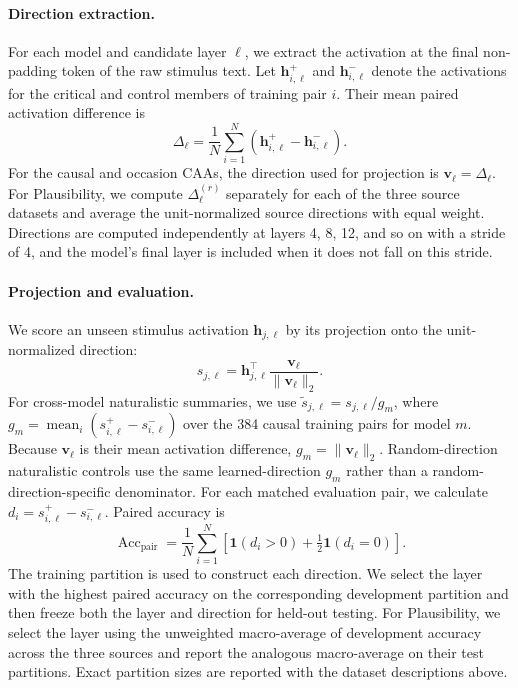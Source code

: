 \documentclass{article}
\begin{document}
\paragraph{Direction extraction.}
For each model and candidate layer $\ell$, we extract the activation at the
final non-padding token of the raw stimulus text. Let
$\mathbf{h}^{+}_{i,\ell}$ and $\mathbf{h}^{-}_{i,\ell}$ denote the activations
for the critical and control members of training pair $i$. Their mean paired
activation difference is
\begin{equation}
\Delta_{\ell}
=\frac{1}{N}\sum_{i=1}^{N}
\left(\mathbf{h}^{+}_{i,\ell}-\mathbf{h}^{-}_{i,\ell}\right).
\label{eq:caa-direction}
\end{equation}
For the causal and occasion CAAs, the direction used for projection is
$\mathbf{v}_{\ell}=\Delta_{\ell}$. For Plausibility, we compute
$\Delta^{(r)}_{\ell}$ separately for each of the three source datasets and
average the unit-normalized source directions with equal weight.
Directions are computed independently at layers 4, 8,
12, and so on with a stride of 4, and the model's final layer is included when it does not fall on
this stride.

\paragraph{Projection and evaluation.}
We score an unseen stimulus activation $\mathbf{h}_{j,\ell}$ by its projection
onto the unit-normalized direction:
\begin{equation}
s_{j,\ell}
=\mathbf{h}_{j,\ell}^{\top}
\frac{\mathbf{v}_{\ell}}{\lVert\mathbf{v}_{\ell}\rVert_2}.
\label{eq:caa-projection}
\end{equation}
For cross-model naturalistic summaries, we use
$\widetilde{s}_{j,\ell}=s_{j,\ell}/g_m$, where
$g_m=\operatorname{mean}_{i}(s^+_{i,\ell}-s^-_{i,\ell})$ over the 384 causal
training pairs for model $m$. Because $\mathbf{v}_{\ell}$ is their mean
activation difference, $g_m=\lVert\mathbf{v}_{\ell}\rVert_2$. Random-direction
naturalistic controls use the same learned-direction $g_m$ rather than a
random-direction-specific denominator.
For each matched evaluation pair, we calculate
$d_i=s^{+}_{i,\ell}-s^{-}_{i,\ell}$. Paired accuracy is
\begin{equation}
\operatorname{Acc}_{\mathrm{pair}}
=\frac{1}{N}\sum_{i=1}^{N}
\left[\mathbf{1}(d_i>0)+\tfrac{1}{2}\mathbf{1}(d_i=0)\right].
\label{eq:caa-paired-accuracy}
\end{equation}
The training partition is used to construct each direction. We select the layer
with the highest paired accuracy on the corresponding development partition and
then freeze both the layer and direction for held-out testing. For Plausibility,
we select the layer using the unweighted macro-average of development accuracy
across the three sources and report the analogous macro-average on their test
partitions. Exact partition sizes are reported with the dataset descriptions above.
\end{document}
